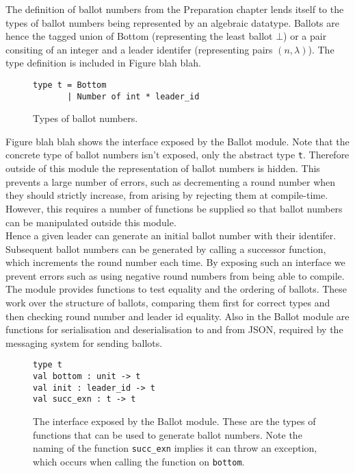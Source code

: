 The definition of ballot numbers from {\color{red} the Preparation chapter} lends itself to the types of ballot numbers being represented by an algebraic datatype. Ballots are hence the tagged union of Bottom (representing the least ballot $\bot$) or a pair consiting of an integer and a leader identifer (representing pairs $\left(n,\lambda\right)$). The type definition is included in {\color{red} Figure blah blah}. \\

\begin{figure}
  \begin{lstlisting}
type t = Bottom
       | Number of int * leader_id
  \end{lstlisting}
    \caption{Types of ballot numbers.}
  \centering
\end{figure}

Figure blah blah shows the interface exposed by the Ballot module. Note that the concrete type of ballot numbers isn't exposed, only the abstract type \texttt{t}. Therefore outside of this module the representation of ballot numbers is hidden. This prevents a large number of errors, such as decrementing a round number when they should strictly increase, from arising by rejecting them at compile-time. However, this requires a number of functions be supplied so that ballot numbers can be manipulated outside this module. \\

Hence a given leader can generate an initial ballot number with their identifer. Subsequent ballot numbers can be generated by calling a successor function, which increments the round number each time. By exposing such an interface we prevent errors such as using negative round numbers from being able to compile. \\

The module provides functions to test equality and the ordering of ballots. These work over the structure of ballots, comparing them first for correct types and then checking round number and leader id equality. Also in the Ballot module are functions for serialisation and deserialisation to and from JSON, required by the messaging system for sending ballots.

\begin{figure}
  \begin{lstlisting}
type t
val bottom : unit -> t
val init : leader_id -> t
val succ_exn : t -> t
  \end{lstlisting}
    \caption{The interface exposed by the Ballot module. These are the types of functions that can be used to generate ballot numbers. Note the naming of the function \texttt{succ\_exn} implies it can throw an exception, which occurs when calling the function on \texttt{bottom}.}
  \centering
\end{figure}

